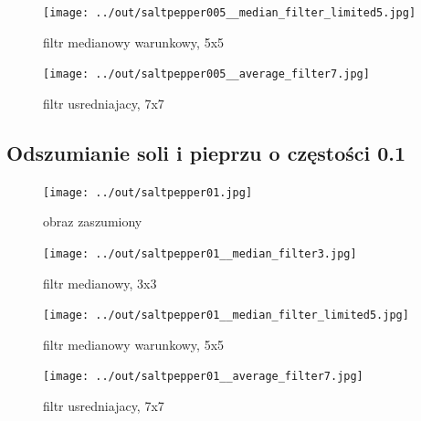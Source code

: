 \documentclass[a4paper,12pt]{article}
\begin{document}
\begin{figure}[h!]
\begin{minipage}[t]{7.5cm}
\begin{center}
\texttt{[image: ../out/saltpepper005\_\_median\_filter\_limited5.jpg]}
\caption{filtr medianowy warunkowy, 5x5}
\end{center}
\end{minipage}
\hfill
\begin{minipage}[t]{7.5cm}
\begin{center}
\texttt{[image: ../out/saltpepper005\_\_average\_filter7.jpg]}
\caption{filtr usredniajacy, 7x7}
\end{center}
\end{minipage}
\end{figure}


\newpage
\subsection{Odszumianie soli i pieprzu o częstości 0.1}
\begin{figure}[h!]
\begin{minipage}[t]{7.5cm}
\begin{center}
\texttt{[image: ../out/saltpepper01.jpg]}
\caption{obraz zaszumiony}
\end{center}
\end{minipage}
\hfill
\begin{minipage}[t]{7.5cm}
\begin{center}
\texttt{[image: ../out/saltpepper01\_\_median\_filter3.jpg]}
\caption{filtr medianowy, 3x3}
\end{center}
\end{minipage}
\end{figure}

\begin{figure}[h!]
\begin{minipage}[t]{7.5cm}
\begin{center}
\texttt{[image: ../out/saltpepper01\_\_median\_filter\_limited5.jpg]}
\caption{filtr medianowy warunkowy, 5x5}
\end{center}
\end{minipage}
\hfill
\begin{minipage}[t]{7.5cm}
\begin{center}
\texttt{[image: ../out/saltpepper01\_\_average\_filter7.jpg]}
\caption{filtr usredniajacy, 7x7}
\end{center}
\end{minipage}
\end{figure}
\end{document}
